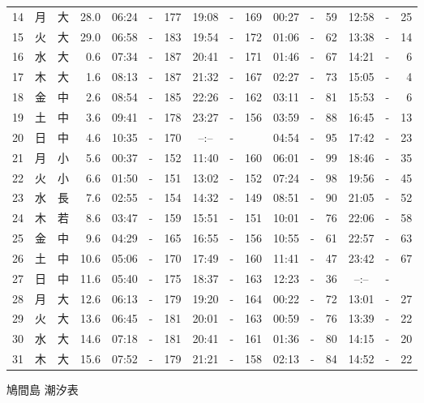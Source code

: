 \documentclass[12pt.a4j]{jsarticle}
\begin{document}
\begin{center}
\begin{table}[ht]
\begin{tabular}{|rc|cr|ccrccr|ccrccr|}
14 & 月 & 大 & 28.0 &  06:24 &-& 177  &  19:08 &-& 169  &   00:27 &-&  59  &   12:58 &-&  25  \\
15 & 火 & 大 & 29.0 &  06:58 &-& 183  &  19:54 &-& 172  &   01:06 &-&  62  &   13:38 &-&  14  \\
16 & 水 & 大 &  0.6 &  07:34 &-& 187  &  20:41 &-& 171  &   01:46 &-&  67  &   14:21 &-&   6  \\
17 & 木 & 大 &  1.6 &  08:13 &-& 187  &  21:32 &-& 167  &   02:27 &-&  73  &   15:05 &-&   4  \\
18 & 金 & 中 &  2.6 &  08:54 &-& 185  &  22:26 &-& 162  &   03:11 &-&  81  &   15:53 &-&   6  \\
19 & 土 & 中 &  3.6 &  09:41 &-& 178  &  23:27 &-& 156  &   03:59 &-&  88  &   16:45 &-&  13  \\
20 & 日 & 中 &  4.6 &  10:35 &-& 170  &  --:-- &-&     &   04:54 &-&  95  &   17:42 &-&  23  \\
21 & 月 & 小 &  5.6 &  00:37 &-& 152  &  11:40 &-& 160  &   06:01 &-&  99  &   18:46 &-&  35  \\
22 & 火 & 小 &  6.6 &  01:50 &-& 151  &  13:02 &-& 152  &   07:24 &-&  98  &   19:56 &-&  45  \\
23 & 水 & 長 &  7.6 &  02:55 &-& 154  &  14:32 &-& 149  &   08:51 &-&  90  &   21:05 &-&  52  \\
24 & 木 & 若 &  8.6 &  03:47 &-& 159  &  15:51 &-& 151  &   10:01 &-&  76  &   22:06 &-&  58  \\
25 & 金 & 中 &  9.6 &  04:29 &-& 165  &  16:55 &-& 156  &   10:55 &-&  61  &   22:57 &-&  63  \\
26 & 土 & 中 & 10.6 &  05:06 &-& 170  &  17:49 &-& 160  &   11:41 &-&  47  &   23:42 &-&  67  \\
27 & 日 & 中 & 11.6 &  05:40 &-& 175  &  18:37 &-& 163  &   12:23 &-&  36  &   --:-- &-&     \\
28 & 月 & 大 & 12.6 &  06:13 &-& 179  &  19:20 &-& 164  &   00:22 &-&  72  &   13:01 &-&  27  \\
29 & 火 & 大 & 13.6 &  06:45 &-& 181  &  20:01 &-& 163  &   00:59 &-&  76  &   13:39 &-&  22  \\
30 & 水 & 大 & 14.6 &  07:18 &-& 181  &  20:41 &-& 161  &   01:36 &-&  80  &   14:15 &-&  20  \\
31 & 木 & 大 & 15.6 &  07:52 &-& 179  &  21:21 &-& 158  &   02:13 &-&  84  &   14:52 &-&  22  \\
   \hline
   \end{tabular}
\end{table}
\newpage
 {\LARGE 鳩間島  潮汐表　　　}

\end{center}
\end{document}
